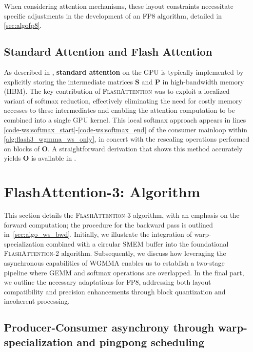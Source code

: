 When considering attention mechanisms, these layout constraints necessitate specific adjustments in the development of an FP8 algorithm, detailed in \cref{sec:algofp8}.

\subsection{Standard Attention and Flash Attention}

As described in \citet{dao2022flashattention}, \textbf{standard attention} on the GPU is typically implemented by explicitly storing the intermediate matrices $\mathbf{S}$ and $\mathbf{P}$ in high-bandwidth memory (HBM). The key contribution of \textsc{FlashAttention} was to exploit a localized variant of softmax reduction, effectively eliminating the need for costly memory accesses to these intermediates and enabling the attention computation to be combined into a single GPU kernel. This local softmax approach appears in lines \ref{code-ws:softmax_start}-\ref{code-ws:softmax_end} of the consumer mainloop within \cref{alg:flash3_wgmma_ws_only}, in concert with the rescaling operations performed on blocks of $\mathbf{O}$. A straightforward derivation that shows this method accurately yields $\mathbf{O}$ is available in \cite[\S 2.3.1]{dao2023flashattention2}.

\section{FlashAttention-3: Algorithm}
\label{sec:algo}

This section details the \textsc{FlashAttention-3} algorithm, with an emphasis on the forward computation; the procedure for the backward pass is outlined in~\cref{sec:algo_ws_bwd}. Initially, we illustrate the integration of warp-specialization combined with a circular SMEM buffer into the foundational \textsc{FlashAttention-2} algorithm. Subsequently, we discuss how leveraging the asynchronous capabilities of WGMMA enables us to establish a two-stage pipeline where GEMM and softmax operations are overlapped. In the final part, we outline the necessary adaptations for FP8, addressing both layout compatibility and precision enhancements through block quantization and incoherent processing.

\subsection{Producer-Consumer asynchrony through warp-specialization and pingpong scheduling}
\label{sec:algo_ws}

